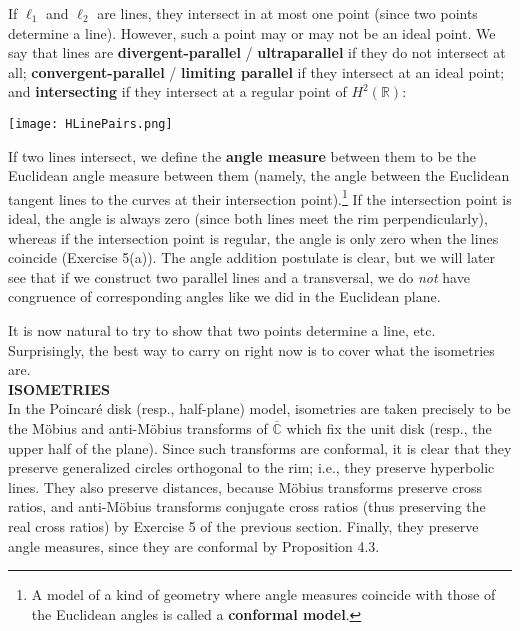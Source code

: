 \documentclass[leqno]{book}
\begin{document}
If $\ell_1$ and $\ell_2$ are lines, they intersect in at most one point (since two points determine a line).  However, such a point may or may not be an ideal point.  We say that lines are \textbf{divergent-parallel} / \textbf{ultraparallel} if they do not intersect at all; \textbf{convergent-parallel} / \textbf{limiting parallel} if they intersect at an ideal point; and \textbf{intersecting} if they intersect at a regular point of $H^2(\mathbb R)$:
\begin{center}\texttt{[image: HLinePairs.png]}\end{center}
If two lines intersect, we define the \textbf{angle measure} between them to be the Euclidean angle measure between them (namely, the angle between the Euclidean tangent lines to the curves at their intersection point).\footnote{A model of a kind of geometry where angle measures coincide with those of the Euclidean angles is called a \textbf{conformal model}.}  If the intersection point is ideal, the angle is always zero (since both lines meet the rim perpendicularly), whereas if the intersection point is regular, the angle is only zero when the lines coincide (Exercise 5(a)).  The angle addition postulate is clear, but we will later see that if we construct two parallel lines and a transversal, we do \emph{not} have congruence of corresponding angles like we did in the Euclidean plane. %

It is now natural to try to show that two points determine a line, etc.  Surprisingly, the best way to carry on right now is to cover what the isometries are.\\

\noindent\textbf{ISOMETRIES}\\

\noindent In the Poincar\'e disk (resp., half-plane) model, isometries are taken precisely to be the M\"obius and anti-M\"obius transforms of $\overline{\mathbb C}$ which fix the unit disk (resp., the upper half of the plane).  Since such transforms are conformal, it is clear that they preserve generalized circles orthogonal to the rim; i.e., they preserve hyperbolic lines.  They also preserve distances, because M\"obius transforms preserve cross ratios, and anti-M\"obius transforms conjugate cross ratios (thus preserving the real cross ratios) by Exercise 5 of the previous section.  Finally, they preserve angle measures, since they are conformal by Proposition 4.3.
\end{document}
